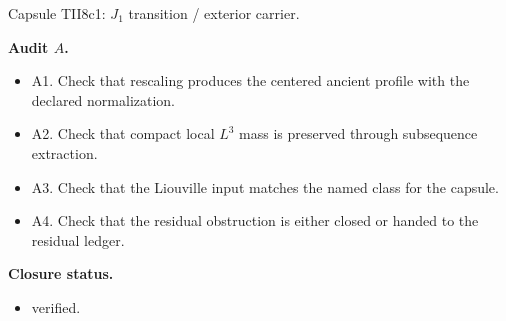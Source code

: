 \documentclass[11pt]{amsart}
\newcommand{\capsulefield}[1]{\par\smallskip\noindent\textbf{#1.}\ }
\begin{document}
\begin{proofcapsule}{Capsule TII8c1: $J_1$ transition / exterior carrier.}
  \capsulefield{Audit \(A\)}
  \begin{itemize}[leftmargin=1.8em]
  \item A1. Check that rescaling produces the centered ancient profile with the declared normalization.
  \item A2. Check that compact local $L^3$ mass is preserved through subsequence extraction.
  \item A3. Check that the Liouville input matches the named class for the capsule.
  \item A4. Check that the residual obstruction is either closed or handed to the residual ledger.
  \end{itemize}
  \capsulefield{Closure status}
  \begin{itemize}[leftmargin=1.8em]
  \item verified.
  \end{itemize}
\end{proofcapsule}
\end{document}
